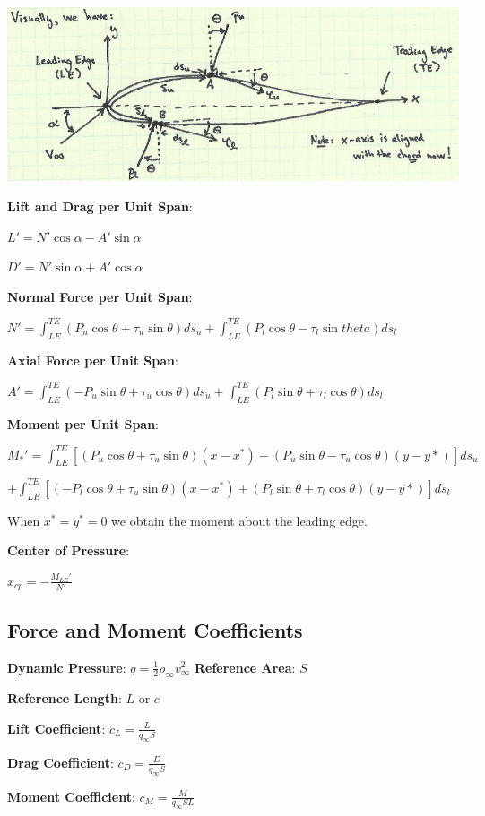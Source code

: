 \documentclass{article}
\begin{document}
\begin{multicols*}{2}
\includegraphics[width=0.5\linewidth]{Images/aero_forces.png}\par
\textbf{Lift and Drag per Unit Span}:\par
$L' = N'\cos{\alpha}-A'\sin{\alpha}$\par
$D' = N'\sin{\alpha}+A'\cos{\alpha}$\par
\textbf{Normal Force per Unit Span}: \par
$N' = \int_{LE}^{TE}(P_u\cos{\theta}+\tau_u\sin{\theta})ds_u+\int_{LE}^{TE}(P_l\cos{\theta}-\tau_l\sin{theta})ds_l$\par
\textbf{Axial Force per Unit Span}: \par
$A' = \int_{LE}^{TE}(-P_u\sin{\theta}+\tau_u\cos{\theta})ds_u+\int_{LE}^{TE}(P_l\sin{\theta}+\tau_l\cos{\theta})ds_l$\par
\textbf{Moment per Unit Span}:\par
$M_*'=\int_{LE}^{TE}\left[ (P_u\cos{\theta}+\tau_u\sin{\theta})(x-x^*)-(P_u\sin{\theta}-\tau_u\cos{\theta})(y-y*)\right]ds_u$ \par$+ \int_{LE}^{TE}\left[(-P_l\cos{\theta}+\tau_u\sin{\theta})(x-x^*)+(P_l\sin{\theta}+\tau_l\cos{\theta})(y-y*)\right]ds_l$\par
When $x^*=y^*=0$ we obtain the moment about the leading edge.\par
\textbf{Center of Pressure}:\par
$x_{cp} = -\frac{M_{LE}'}{N'}$\par

\subsection*{Force and Moment Coefficients}
\textbf{Dynamic Pressure}: $q = \frac{1}{2}\rho_\infty v_\infty^2$
\textbf{Reference Area}: $S$\par
\textbf{Reference Length}: $L$ or $c$\par
\textbf{Lift Coefficient}: $c_L=\frac{L}{q_\infty S}$\par
\textbf{Drag Coefficient}: $c_D = \frac{D}{q_\infty S}$\par
\textbf{Moment Coefficient}: $c_M=\frac{M}{q_\infty S L}$


\end{multicols*}
\end{document}

